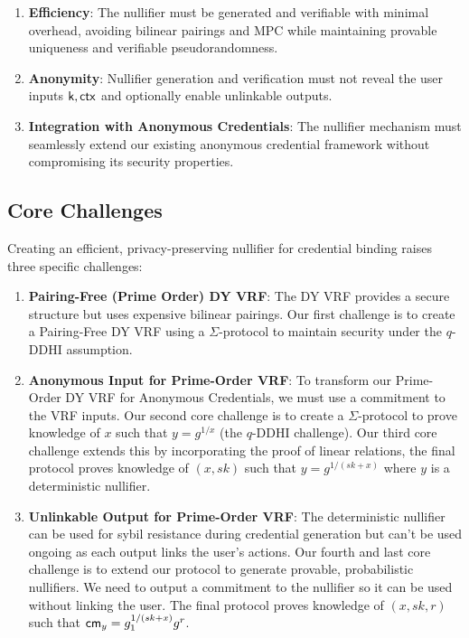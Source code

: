 \begin{enumerate}
    \item \textbf{Efficiency}: The nullifier must be generated and verifiable with minimal overhead, avoiding bilinear pairings and MPC while maintaining provable uniqueness and verifiable pseudorandomness.
    
    \item \textbf{Anonymity}: Nullifier generation and verification must not reveal the user inputs $\mathsf{k}, \mathsf{ctx}$ and optionally enable unlinkable outputs. 
    
    \item \textbf{Integration with Anonymous Credentials}: The nullifier mechanism must seamlessly extend our existing anonymous credential framework without compromising its security properties.
\end{enumerate}

\subsection{Core Challenges}


Creating an efficient, privacy-preserving nullifier for credential binding raises three specific challenges:

\begin{enumerate}
    \item \textbf{Pairing-Free (Prime Order) DY VRF}: The DY VRF provides a secure structure but uses expensive bilinear pairings. Our first challenge is to create a Pairing-Free DY VRF using a $\Sigma$-protocol to maintain security under the $q$-DDHI assumption.
    
    \item \textbf{Anonymous Input for Prime-Order VRF}: To transform our Prime-Order DY VRF for Anonymous Credentials, we must use a commitment to the VRF inputs. Our second core challenge is to create a $\Sigma$-protocol to prove knowledge of $x$ such that $y = g^{1/x}$ (the $q$-DDHI challenge). Our third core challenge extends this by incorporating the proof of linear relations, the final protocol proves knowledge of $(x, sk)$ such that $y = g^{1/(sk + x)}$ where $y$ is a deterministic nullifier.
    
    \item \textbf{Unlinkable Output for Prime-Order VRF}: The deterministic nullifier can be used for sybil resistance during credential generation but can't be used ongoing as each output links the user's actions. Our fourth and last core challenge is to extend our protocol to generate provable, probabilistic nullifiers. We need to output a commitment to the nullifier so it can be used without linking the user. The final protocol proves knowledge of $(x, sk,r)$ such that $\mathsf{cm}_y = g_1^{1/(sk + x)}g^r$. 
\end{enumerate}



